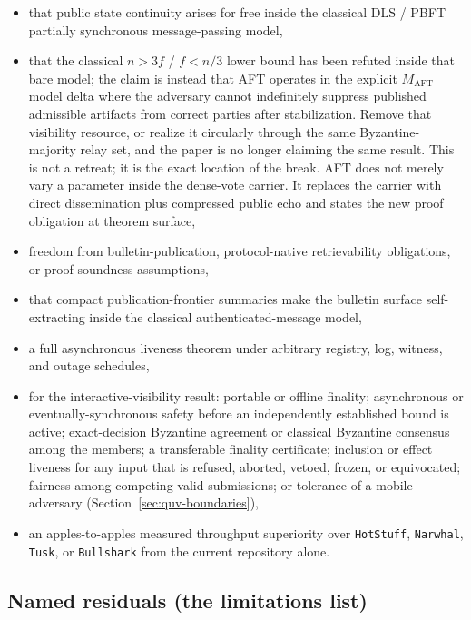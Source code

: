 \documentclass[11pt]{article}
\newcommand{\AFT}{\textsc{AFT}}
\newcommand{\code}[1]{\texttt{#1}}
\begin{document}
\begin{itemize}[leftmargin=1.5em]
\item that public state continuity arises for free inside the classical DLS /
PBFT partially synchronous message-passing model,
\item that the classical \(n > 3f\) / \(f < n/3\) lower bound has been
refuted inside that bare model; the claim is instead that \AFT{} operates in
the explicit \(M_{\mathrm{AFT}}\) model delta where the adversary cannot indefinitely
suppress published admissible artifacts from correct parties after
stabilization. Remove that visibility resource, or realize it circularly
through the same Byzantine-majority relay set, and the paper is no longer
claiming the same result. This is not a retreat; it is the exact location of
the break. \AFT{} does not merely vary a parameter inside the dense-vote
carrier. It replaces the carrier with direct dissemination plus compressed
public echo and states the new proof obligation at theorem surface,
\item freedom from bulletin-publication, protocol-native retrievability
obligations, or proof-soundness assumptions,
\item that compact publication-frontier summaries make the bulletin surface
self-extracting inside the classical authenticated-message model,
\item a full asynchronous liveness theorem under arbitrary registry, log,
witness, and outage schedules,
\item for the interactive-visibility result: portable or offline
finality; asynchronous or eventually-synchronous safety before an
independently established bound is active; exact-decision Byzantine
agreement or classical Byzantine consensus among the members; a
transferable finality certificate; inclusion or effect liveness for any
input that is refused, aborted, vetoed, frozen, or equivocated; fairness
among competing valid submissions; or tolerance of a mobile adversary
(Section~\ref{sec:quv-boundaries}),
\item an apples-to-apples measured throughput superiority over
\code{HotStuff}, \code{Narwhal}, \code{Tusk}, or \code{Bullshark} from the
current repository alone.
\end{itemize}

\subsection{Named residuals (the limitations list)}
\label{sec:residuals}
\end{document}
